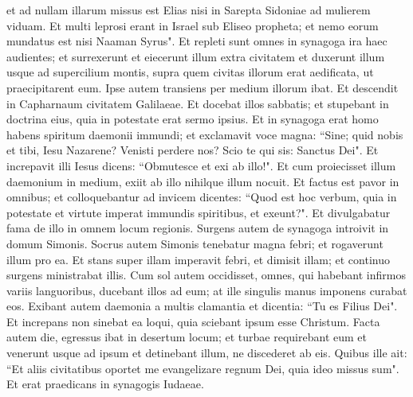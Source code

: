 \begin{biblechapter}
\verse et ad nullam illarum missus est Elias nisi in Sarepta Sidoniae ad mulierem viduam.  
\verse Et multi leprosi erant in Israel sub Eliseo propheta; et nemo eorum mundatus est nisi Naaman Syrus". 
\verse Et repleti sunt omnes in synagoga ira haec audientes; 
\verse et surrexerunt et eiecerunt illum extra civitatem et duxerunt illum usque ad supercilium montis, supra quem civitas illorum erat aedificata, ut praecipitarent eum.  
\verse Ipse autem transiens per medium illorum ibat. 
\verse Et descendit in Capharnaum civitatem Galilaeae. Et docebat illos sabbatis;  
\verse et stupebant in doctrina eius, quia in potestate erat sermo ipsius. 
\verse Et in synagoga erat homo habens spiritum daemonii immundi; et exclamavit voce magna: 
\verse “Sine; quid nobis et tibi, Iesu Nazarene? Venisti perdere nos? Scio te qui sis: Sanctus Dei". 
\verse Et increpavit illi Iesus dicens: “Obmutesce et exi ab illo!". Et cum proiecisset illum daemonium in medium, exiit ab illo nihilque illum nocuit. 
\verse Et factus est pavor in omnibus; et colloquebantur ad invicem dicentes: “Quod est hoc verbum, quia in potestate et virtute imperat immundis spiritibus, et exeunt?". 
\verse Et divulgabatur fama de illo in omnem locum regionis. 
\verse Surgens autem de synagoga introivit in domum Simonis. Socrus autem Simonis tenebatur magna febri; et rogaverunt illum pro ea. 
\verse Et stans super illam imperavit febri, et dimisit illam; et continuo surgens ministrabat illis. 
\verse Cum sol autem occidisset, omnes, qui habebant infirmos variis languoribus, ducebant illos ad eum; at ille singulis manus imponens curabat eos. 
\verse Exibant autem daemonia a multis clamantia et dicentia: “Tu es Filius Dei". Et increpans non sinebat ea loqui, quia sciebant ipsum esse Christum. 
\verse Facta autem die, egressus ibat in desertum locum; et turbae requirebant eum et venerunt usque ad ipsum et detinebant illum, ne discederet ab eis. 
\verse Quibus ille ait: “Et aliis civitatibus oportet me evangelizare regnum Dei, quia ideo missus sum". 
\verse Et erat praedicans in synagogis Iudaeae. 
\end{biblechapter}

